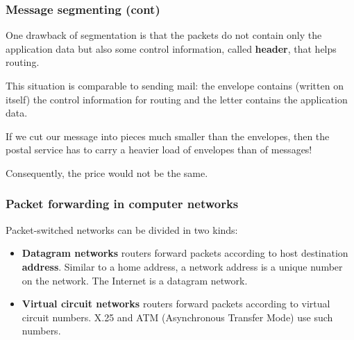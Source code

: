 %
\begin{frame}
\frametitle{Message segmenting (cont)}

One drawback of segmentation is that the packets do not contain only
the application data but also some control information, called
\textbf{header}, that helps routing.

\bigskip

This situation is comparable to sending mail: the envelope contains
(written on itself) the control information for routing and the letter
contains the application data.

\bigskip

If we cut our message into pieces much smaller than the envelopes,
then the postal service has to carry a heavier load of envelopes than
of messages! 

\bigskip

Consequently, the price would not be the same.

\end{frame}

%
\begin{frame}
\frametitle{Packet forwarding in computer networks}

Packet-switched networks can be divided in two kinds:
\begin{itemize}

  \item \textbf{Datagram networks} routers forward packets according
  to host destination \textbf{address}. Similar to a home address, a
  network address is a unique number on the network. The Internet is a
  datagram network.

  \item \textbf{Virtual circuit networks} routers forward packets
  according to virtual circuit numbers. X.25 and ATM (Asynchronous
  Transfer Mode) use such numbers.

\end{itemize}

\end{frame}

